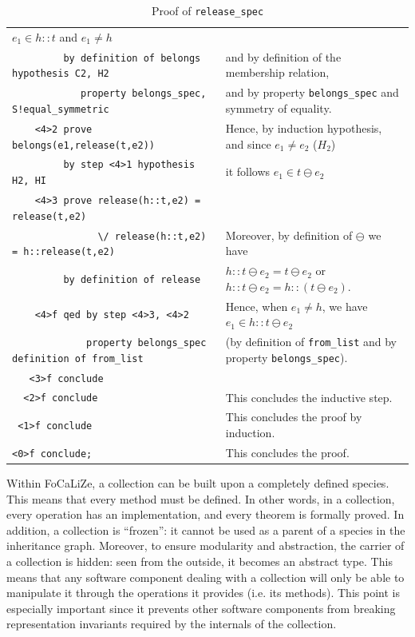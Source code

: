 \documentclass[submission,copyright,creativecommons]{eptcs}
\begin{document}
\begin{table}
\begin{center}
{\begin{tabular}{|ll|}
$e_1 \in h::t$ and $e_1 \neq h$ \\
\verb+         by definition of belongs hypothesis C2, H2+ & and by
definition of the membership relation, \\
\verb+            property belongs_spec, S!equal_symmetric+ & and by
property \verb+belongs_spec+ and symmetry of equality.\\     
\verb+    <4>2 prove belongs(e1,release(t,e2))+ & Hence, by induction
hypothesis, and since
$e_1 \neq e_2$ ($H_2$)\\
\verb+         by step <4>1 hypothesis H2, HI+ & it follows $e_1 \in t
\ominus e_2$\\
\verb+    <4>3 prove release(h::t,e2) = release(t,e2)+ & \\
\verb+               \/ release(h::t,e2) = h::release(t,e2)+ & 
Moreover, by definition of $\ominus$ we have\\
\verb+         by definition of release+ & 
$h::t \ominus e_2 = t \ominus e_2$ or $h::t \ominus e_2 = h::(t \ominus e_2)$.
\\
\verb+    <4>f qed by step <4>3, <4>2 + & Hence, when $e_1 \neq h$, we have $e_1 \in h::t \ominus e_2$\\
\verb+             property belongs_spec definition of from_list+ & 
(by definition of
\verb+from_list+ and by
property
\verb+belongs_spec+). \\
\verb+   <3>f conclude+ & \\
\verb+  <2>f conclude + & This concludes the inductive step.\\
\verb+ <1>f conclude + & This concludes the proof by induction. \\
 \verb+<0>f conclude;+ & This concludes the proof.\\
\hline
\end{tabular}
}
\end{center}
\caption{Proof of {\footnotesize \tt release\_spec}}\label{proof_release_spec}
\end{table}

Within FoCaLiZe, a collection can be built upon a completely defined species. This means
that every method must be defined. In other words, in a collection, every 
operation has an implementation, and every theorem is formally proved.
In addition, a collection is ``frozen'': it cannot be used as a parent
of a species in the inheritance graph. Moreover, to ensure modularity
and abstraction, the carrier of a collection is hidden: seen from the
outside, it becomes an abstract type. This means
that any software component dealing with a collection will only be
able to manipulate it through the operations it
provides (i.e. its methods). This point is especially important since
it prevents other
software components from breaking representation invariants required by the
internals of the collection.
\end{document}
